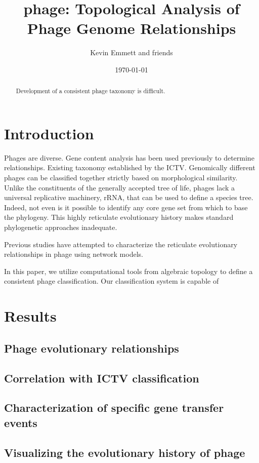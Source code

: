 \documentclass[12pt]{article}
\title{phage: Topological Analysis of Phage Genome Relationships}
\author{Kevin Emmett and friends}
\date{\today}
\begin{document}
\maketitle

\begin{abstract}
Development of a consistent phage taxonomy is difficult.
\end{abstract}

\section*{Introduction}
Phages are diverse.
Gene content analysis has been used previously to determine relationships.
Existing taxonomy established by the ICTV.
Genomically different phages can be classified together strictly based on morphological similarity.
Unlike the constituents of the generally accepted tree of life, phages lack a universal replicative machinery, rRNA, that can be used to define a species tree.
Indeed, not even is it possible to identify any core gene set from which to base the phylogeny.
This highly reticulate evolutionary history makes standard phylogenetic approaches inadequate.

Previous studies have attempted to characterize the reticulate evolutionary relationships in phage using network models.

In this paper, we utilize computational tools from algebraic topology to define a consistent phage classification.
Our classification system is capable of 
\section*{Results}

\subsection*{Phage evolutionary relationships}

\subsection*{Correlation with ICTV classification}

\subsection*{Characterization of specific gene transfer events}

\subsection*{Visualizing the evolutionary history of phage}
\end{document}
